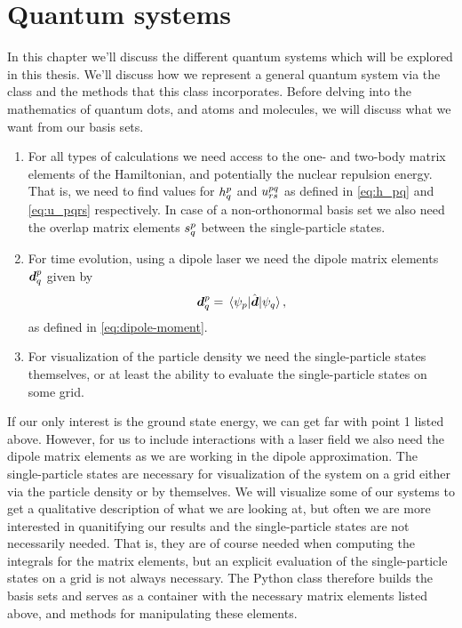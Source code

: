 \chapter{Quantum systems}
    In this chapter we'll discuss the different quantum systems which will be
    explored in this thesis.
    We'll discuss how we represent a general quantum system via the class
     and the methods that this class incorporates.
    Before delving into the mathematics of quantum dots, and atoms and
    molecules, we will discuss what we want from our basis sets.
    \begin{enumerate}
        \item For all types of calculations we need access to the one- and
            two-body matrix elements of the Hamiltonian, and potentially the
            nuclear repulsion energy.
            That is, we need to find values for $h^{p}_{q}$ and
            $u^{pq}_{rs}$ as defined in \autoref{eq:h_pq} and
            \autoref{eq:u_pqrs} respectively.
            In case of a non-orthonormal basis set we also need the overlap
            matrix elements $s^{p}_{q}$ between the single-particle
            states.
        \item For time evolution, using a dipole laser we need the dipole matrix
            elements $\boldsymbol{d}^{p}_{q}$ given by
            \begin{align}
                \boldsymbol{d}^{p}_{q}
                = \mel*{\psi_p}{\hat{\boldsymbol{d}}}{\psi_q},
            \end{align}
            as defined in \autoref{eq:dipole-moment}.
        \item For visualization of the particle density we need the
            single-particle states themselves, or at least the ability to
            evaluate the single-particle states on some grid.
    \end{enumerate}
    If our only interest is the ground state energy, we can get far with point 1
    listed above.
    However, for us to include interactions with a laser field we also need the
    dipole matrix elements as we are working in the dipole approximation.
    The single-particle states are necessary for visualization of the system on
    a grid either via the particle density or by themselves.
    We will visualize some of our systems to get a qualitative description of
    what we are looking at, but often we are more interested in quanitifying our
    results and the single-particle states are not necessarily needed.
    That is, they are of course needed when computing the integrals for the
    matrix elements, but an explicit evaluation of the single-particle states on
    a grid is not always necessary.
    The Python class  therefore builds the basis sets and
    serves as a container with the necessary matrix elements listed above, and
    methods for manipulating these elements.


